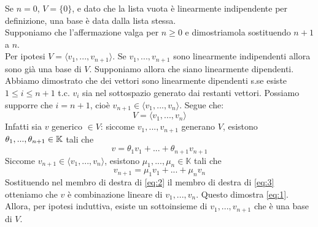   \begin{dimostrazione}
    Se $n=0$, $V=\{0\}$, e dato che la lista vuota è linearmente indipendente per definizione, una base è data dalla lista stessa. \\
    Supponiamo che l'affermazione valga per $n\geq 0$ e dimostriamola sostituendo $n+1$ a $n$. \\
    Per ipotesi $V=\langle v_1,...,v _{n+1}\rangle $. Se $v_1,...,v _{n+1}$ sono linearmente indipendenti allora sono già una base di $V$. Supponiamo allora che siano linearmente dipendenti. Abbiamo dimostrato che dei vettori sono linearmente dipendenti s.se esiste $1\leq i\leq n+1$ t.c. $v_i$ sia nel sottospazio generato dai restanti vettori. Possiamo supporre che $i=n+1$, cioè $v _{n+1}\in\langle v_1,...,v_n\rangle $. Segue che:
    \begin{equation}
      V=\langle v_1,...,v_n\rangle
      \label{eq:1}
    \end{equation}
    Infatti sia $v$ generico $\in V$: siccome $v_1,...,v _{n+1}$ generano $V$, esistono $\theta_1,...,\theta _{n+1}\\\in \mathbb{K}$ tali che
    \begin{equation}
      v=\theta_1v_1+...+\theta _{n+1}v _{n+1}
      \label{eq:2}
    \end{equation}
    Siccome $v _{n+1}\in \langle v_1,...,v_n\rangle$, esistono $\mu_1,...,\mu_n\in \mathbb{K}$ tali che
    \begin{equation}
      v _{n+1}=\mu_1v_1+...+\mu_nv_n
      \label{eq:3}
    \end{equation}
    Sostituendo nel membro di destra di \ref{eq:2} il membro di destra di \ref{eq:3} otteniamo che $v$ è combinazione lineare di $v_1,...,v_n$. Questo dimostra \ref{eq:1}. Allora, per ipotesi induttiva, esiste un sottoinsieme di $v_1,...,v _{n+1}$ che è una base di $V$.
  \end{dimostrazione}

